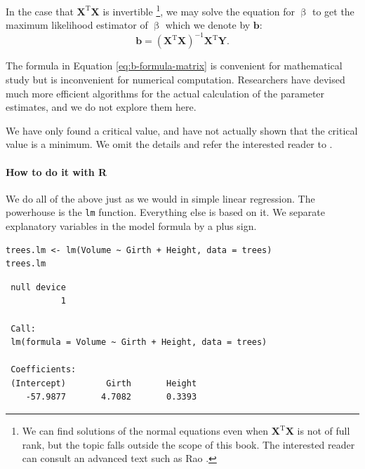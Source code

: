 \documentclass[captions=tableheading]{scrbook}
\begin{document}
In the case that \(\mathbf{X}^{\mathrm{T}}\mathbf{X}\) is invertible
\footnote{We can find solutions of the normal equations even when \(\mathbf{X}^{\mathrm{T}}\mathbf{X}\) is not of full rank, but the topic falls outside the scope of this book. The interested reader can consult an advanced text such as Rao \cite{Rao1999}.},
we may solve the equation for \(\upbeta\) to get the maximum likelihood estimator of \(\upbeta\) which we denote by \(\mathbf{b}\):
\begin{equation}
\mathbf{b}=\left(\mathbf{X}^{\mathrm{T}}\mathbf{X}\right)^{-1}\mathbf{X}^{\mathrm{T}}\mathbf{Y}.\label{eq:b-formula-matrix}
\end{equation}

\begin{rem}
The formula in Equation \ref{eq:b-formula-matrix} is convenient for mathematical study but is inconvenient for numerical computation. Researchers have devised much more efficient algorithms for the actual calculation of the parameter estimates, and we do not explore them here.
\end{rem}

\begin{rem}
We have only found a critical value, and have not actually shown that the critical value is a minimum. We omit the details and refer the interested reader to \cite{Rao1999}.
\end{rem}

\paragraph*{How to do it with \textsf{R}}

We do all of the above just as we would in simple linear regression. The powerhouse is the \texttt{lm} function. Everything else is based on it. We separate explanatory variables in the model formula by a plus sign.


\begin{verbatim}
trees.lm <- lm(Volume ~ Girth + Height, data = trees)
trees.lm
\end{verbatim}

\begin{verbatim}
 null device 
           1
  
 Call:
 lm(formula = Volume ~ Girth + Height, data = trees)
 
 Coefficients:
 (Intercept)        Girth       Height  
    -57.9877       4.7082       0.3393
\end{verbatim}
\end{document}
